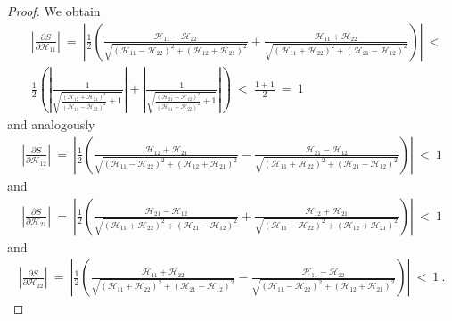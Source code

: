 \documentclass{article}
\begin{document}
\begin{proof}
We obtain
\begin{align}
&\left|\frac{\partial S}{\partial {\mathcal H}_{11}}\right| \ = \
\left|\frac{1}{2} \left(\frac{{\mathcal H}_{11}-{\mathcal H}_{22}}{\sqrt{({\mathcal H}_{11}-{\mathcal H}_{22})^2+({\mathcal H}_{12}+{\mathcal H}_{21})^2}}+\frac{{\mathcal H}_{11}+{\mathcal H}_{22}}{\sqrt{({\mathcal H}_{11}+{\mathcal H}_{22})^2+({\mathcal H}_{21}-{\mathcal H}_{12})^2}}\right)\right|
\ < \\\nonumber
&\frac{1}{2} \left(\left|\frac{1}{\sqrt{\frac{({\mathcal H}_{12}+{\mathcal H}_{21})^2}{({\mathcal H}_{11}-{\mathcal H}_{22})^2}+1}}\right|+\left|\frac{1}{\sqrt{\frac{({\mathcal H}_{21}-{\mathcal H}_{12})^2}{({\mathcal H}_{11}+{\mathcal H}_{22})^2}+1}}\right|\right)
\ < \ \frac{1+1}{2} \ = \ 1
\end{align}
and analogously 
\begin{align}
\left|\frac{\partial S}{\partial {\mathcal H}_{12}}\right|\ = \ \left|\frac{1}{2}
\left(\frac{{\mathcal H}_{12}+{\mathcal H}_{21}}{\sqrt{({\mathcal H}_{11}-{\mathcal H}_{22})^2+({\mathcal H}_{12}+{\mathcal H}_{21})^2}}-\frac{{\mathcal H}_{21}-{\mathcal H}_{12}}{\sqrt{({\mathcal H}_{11}+{\mathcal H}_{22})^2+({\mathcal H}_{21}-{\mathcal H}_{12})^2}}\right)\right|\ < \ 1
\end{align}
and
\begin{align}
\left|\frac{\partial S}{\partial {\mathcal H}_{21}}\right| \ = \ \left|\frac{1}{2} \left(\frac{{\mathcal H}_{21}-{\mathcal H}_{12}}{\sqrt{({\mathcal H}_{11}+{\mathcal H}_{22})^2+({\mathcal H}_{21}-{\mathcal H}_{12})^2}}+\frac{{\mathcal H}_{12}+{\mathcal H}_{21}}{\sqrt{({\mathcal H}_{11}-{\mathcal H}_{22})^2+({\mathcal H}_{12}+{\mathcal H}_{21})^2}}\right)\right|\ < \ 1
\end{align}
and
\begin{align}
\left|\frac{\partial S}{\partial {\mathcal H}_{22}}\right| \ = \ \left|\frac{1}{2}
\left(\frac{{\mathcal H}_{11}+{\mathcal H}_{22}}{\sqrt{({\mathcal H}_{11}+{\mathcal H}_{22})^2+({\mathcal H}_{21}-{\mathcal H}_{12})^2}}-\frac{{\mathcal H}_{11}-{\mathcal H}_{22}}{\sqrt{({\mathcal H}_{11}-{\mathcal H}_{22})^2+({\mathcal H}_{12}+{\mathcal H}_{21})^2}}\right)\right|\
  < \ 1 \ .
\end{align}


\end{proof}
\end{document}
